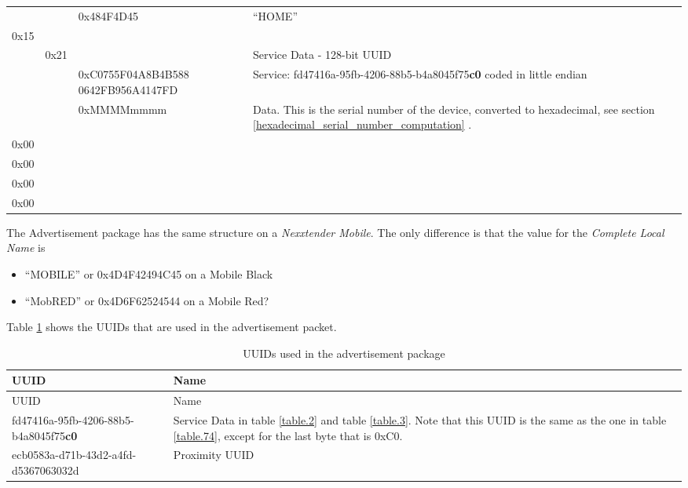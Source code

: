 \documentclass[a4paper]{article}
\newcommand{\secref}[1]{\ref{#1} \nameref{#1}}
\begin{document}
\begin{longtable}[]{ p{0.8cm}  p{0.8cm}  p{0.1cm}  p{4cm} p{9cm} }
	& & \multicolumn{2}{l}{0x484F4D45} & ``HOME'' \\
	0x15 & & \multicolumn{2}{l}{} & \\
	& 0x21 & \multicolumn{2}{l}{} & Service Data - 128-bit UUID \\
	& & \multicolumn{2}{p{4cm}}{0xC0755F04A8B4B588 0642FB956A4147FD} & Service:
	fd47416a-95fb-4206-88b5-b4a8045f75\textbf{c0} coded in little endian \\
	& & \multicolumn{2}{l}{0xMMMMmmmm} & Data. This is the serial number of the device, converted
	to hexadecimal, see section \secref{hexadecimal_serial_number_computation}. \\
	0x00 & & \multicolumn{2}{l}{} & \\
	0x00 & & \multicolumn{2}{l}{} & \\
	0x00 & & \multicolumn{2}{l}{} & \\
	0x00 & & \multicolumn{2}{l}{} & \\
\end{longtable}
\endgroup

The Advertisement package has the same structure on a \emph{Nexxtender Mobile}. 
The only difference is that the value for the \emph{Complete Local Name} is 

\begin{itemize}
	\item``MOBILE'' or 0x4D4F42494C45 on a Mobile Black
	\item ``MobRED'' or 0x4D6F62524544 on a Mobile Red?
\end{itemize}

Table \ref{table.4} shows the UUID\textquotesingle s that are used in the advertisement packet.

\begingroup
\renewcommand*{\arraystretch}{1.4} %
\begin{longtable}[]{p{6.5cm} p{9cm}}
	\caption{UUID\textquotesingle s used in the advertisement package}
	\label{table.4}
	\tabularnewline
	\toprule\noalign{}
	UUID                                          & Name                  \\
	\midrule\noalign{}
	\endfirsthead
	\toprule\noalign{}
	UUID                                          & Name                  \\
	\midrule\noalign{}
	\endhead
	\bottomrule\noalign{}
	\endlastfoot
	fd47416a-95fb-4206-88b5-b4a8045f75\textbf{c0} & Service Data in table 
	\ref{table.2} and table \ref{table.3}. 
	Note that this UUID is the same as the one in table \ref{table.74},
	except for the last byte that is 0xC0. \\
	ecb0583a-d71b-43d2-a4fd-d5367063032d          & Proximity UUID        \\
\end{longtable}
\endgroup
\end{document}
